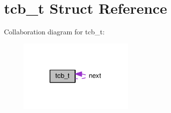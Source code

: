 \hypertarget{structtcb__t}{}\section{tcb\+\_\+t Struct Reference}
\label{structtcb__t}


Collaboration diagram for tcb\+\_\+t\+:\nopagebreak
\begin{figure}[H]
\begin{center}
\leavevmode
\includegraphics[width=158pt]{structtcb__t__coll__graph}
\end{center}
\end{figure}
